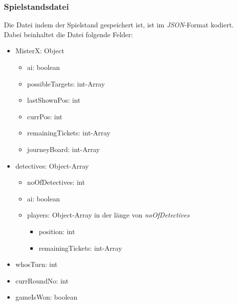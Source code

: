     \subsubsection{Spielstandsdatei}\label{Spielstandsdatei}
        Die Datei indem der Spielstand gespeichert ist, ist im \textit{JSON}-Format kodiert.
        Dabei beinhaltet die Datei folgende Felder:
        \begin{itemize}
            \item MisterX: Object
                \begin{itemize}
                    \item ai: boolean
                    \item possibleTargets: int-Array
                    \item lastShownPos: int
                    \item currPos: int
                    \item remainingTickets: int-Array
                    \item journeyBoard: int-Array
                \end{itemize}
            \item detectives: Object-Array
                \begin{itemize}
                    \item noOfDetectives: int
                    \item ai: boolean
                    \item players: Object-Array in der länge von \textit{noOfDetectives}
                        \begin{itemize}
                            \item position: int
                            \item remainingTickets: int-Array
                        \end{itemize}
                \end{itemize}
            \item whosTurn: int
            \item currRoundNo: int
            \item gameIsWon: boolean
        \end{itemize}

